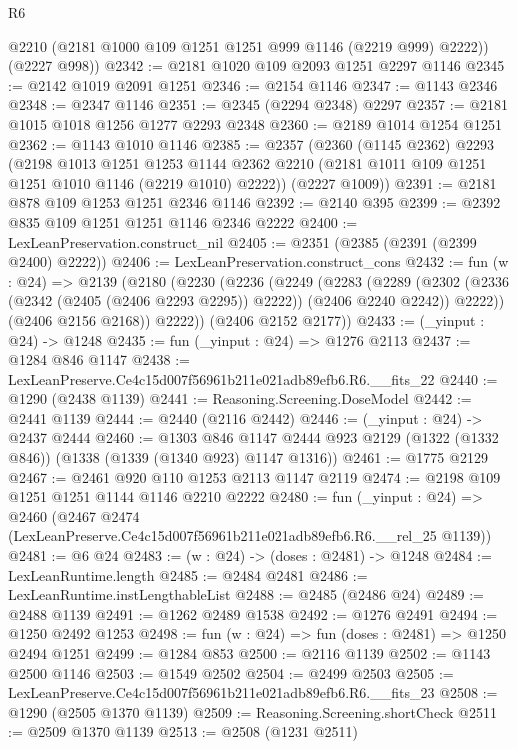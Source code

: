 \begin{lexlean}{R6}
\begin{coremodule}
        @2210
        (@2181 @1000 @109 @1251 @1251 @999 @1146 (@2219 @999) @2222))
      (@2227 @998))
@2342 := @2181 @1020 @109 @2093 @1251 @2297 @1146
@2345 := @2142 @1019 @2091 @1251
@2346 := @2154 @1146
@2347 := @1143 @2346
@2348 := @2347 @1146
@2351 := @2345 (@2294 @2348) @2297
@2357 := @2181 @1015 @1018 @1256 @1277 @2293 @2348
@2360 := @2189 @1014 @1254 @1251
@2362 := @1143 @1010 @1146
@2385 := @2357
    (@2360
      (@1145 @2362)
      @2293
      (@2198
        @1013
        @1251
        @1253
        @1144
        @2362
        @2210
        (@2181 @1011 @109 @1251 @1251 @1010 @1146 (@2219 @1010) @2222))
      (@2227 @1009))
@2391 := @2181 @878 @109 @1253 @1251 @2346 @1146
@2392 := @2140 @395
@2399 := @2392 @835 @109 @1251 @1251 @1146 @2346 @2222
@2400 := LexLeanPreservation.construct_nil
@2405 := @2351 (@2385 (@2391 (@2399 @2400) @2222))
@2406 := LexLeanPreservation.construct_cons
@2432 := fun (w : @24) =>
  @2139
    (@2180
      (@2230
        (@2236
          (@2249
            (@2283
              (@2289
                (@2302 (@2336 (@2342 (@2405 (@2406 @2293 @2295)) @2222)) (@2406 @2240 @2242))
                @2222))
            (@2406 @2156 @2168))
          @2222))
      (@2406 @2152 @2177))
@2433 := (_yinput : @24) -> @1248
@2435 := fun (_yinput : @24) => @1276 @2113
@2437 := @1284 @846 @1147
@2438 := LexLeanPreserve.Ce4c15d007f56961b211e021adb89efb6.R6.__fits_22
@2440 := @1290 (@2438 @1139)
@2441 := Reasoning.Screening.DoseModel
@2442 := @2441 @1139
@2444 := @2440 (@2116 @2442)
@2446 := (_yinput : @24) -> @2437 @2444
@2460 := @1303
    @846
    @1147
    @2444
    @923
    @2129
    (@1322 (@1332 @846))
    (@1338 (@1339 (@1340 @923) @1147 @1316))
@2461 := @1775 @2129
@2467 := @2461 @920 @110 @1253 @2113 @1147 @2119
@2474 := @2198 @109 @1251 @1251 @1144 @1146 @2210 @2222
@2480 := fun (_yinput : @24) =>
  @2460 (@2467 @2474 (LexLeanPreserve.Ce4c15d007f56961b211e021adb89efb6.R6.__rel_25 @1139))
@2481 := @6 @24
@2483 := (w : @24) -> (doses : @2481) -> @1248
@2484 := LexLeanRuntime.length
@2485 := @2484 @2481
@2486 := LexLeanRuntime.instLengthableList
@2488 := @2485 (@2486 @24)
@2489 := @2488 @1139
@2491 := @1262 @2489 @1538
@2492 := @1276 @2491
@2494 := @1250 @2492 @1253
@2498 := fun (w : @24) => fun (doses : @2481) => @1250 @2494 @1251
@2499 := @1284 @853
@2500 := @2116 @1139
@2502 := @1143 @2500 @1146
@2503 := @1549 @2502
@2504 := @2499 @2503
@2505 := LexLeanPreserve.Ce4c15d007f56961b211e021adb89efb6.R6.__fits_23
@2508 := @1290 (@2505 @1370 @1139)
@2509 := Reasoning.Screening.shortCheck
@2511 := @2509 @1370 @1139
@2513 := @2508 (@1231 @2511)

\end{coremodule}
\end{lexlean}
